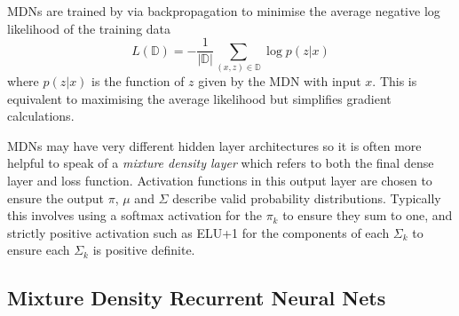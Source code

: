 \documentclass{article}
\theoremstyle{definition}
\begin{document}
MDNs are trained by via backpropagation to minimise the average negative log likelihood of the training data
$$L(\mathbb{D}) = -\frac1{|\mathbb{D}|} \sum_{(x,z) \in \mathbb{D}} \log p (z|x)$$
where $p(z|x)$ is the function of $z$ given by the MDN with input $x$.
This is equivalent to maximising the average likelihood but simplifies gradient calculations.

MDNs may have very different hidden layer architectures so it is often more helpful to speak of a \textit{mixture density layer} which refers to both the final dense layer and loss function.
Activation functions in this output layer are chosen to ensure the output $\pi$, $\mu$ and $\Sigma$ describe valid probability distributions.
Typically this involves using a softmax activation for the $\pi_k$ to ensure they sum to one, and strictly positive activation such as ELU+1 for the components of each $\Sigma_k$ to ensure each $\Sigma_k$ is positive definite.

\subsection{Mixture Density Recurrent Neural Nets}
\end{document}
